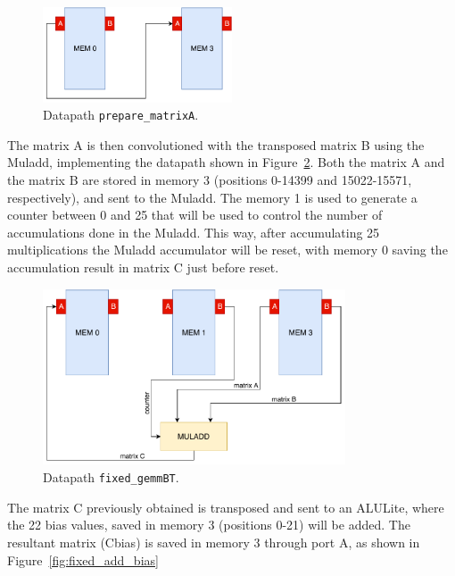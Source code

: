 \begin{figure}[!htb]
	\centering
	\includegraphics[width=0.5\textwidth]{Figures/prepare_matrixA.pdf}
	\caption{Datapath {\tt prepare\_matrixA}.}
	\label{fig:prepare_matrixA}
\end{figure}

The matrix A is then convolutioned with the transposed matrix B using the
Muladd, implementing the datapath shown in Figure~\ref{fig:fixed_gemmBT}. Both
the matrix A and the matrix B are stored in memory 3 (positions 0-14399 and
15022-15571, respectively), and sent to the Muladd. The memory 1 is used to
generate a counter between 0 and 25 that will be used to control the number of
accumulations done in the Muladd. This way, after accumulating 25
multiplications the Muladd accumulator will be reset, with memory 0 saving the
accumulation result in matrix C just before reset.

\begin{figure}[!htb]
	\centering
	\includegraphics[width=0.8\textwidth]{Figures/fixed_gemmBT.pdf}
	\caption{Datapath {\tt fixed\_gemmBT}.}
	\label{fig:fixed_gemmBT}
\end{figure}

The matrix C previously obtained is transposed and sent to an ALULite, where the 22 bias
values, saved in memory 3 (positions 0-21) will be added. The resultant matrix (Cbias)
is saved in memory 3 through port A, as shown in Figure~\ref{fig:fixed_add_bias}

